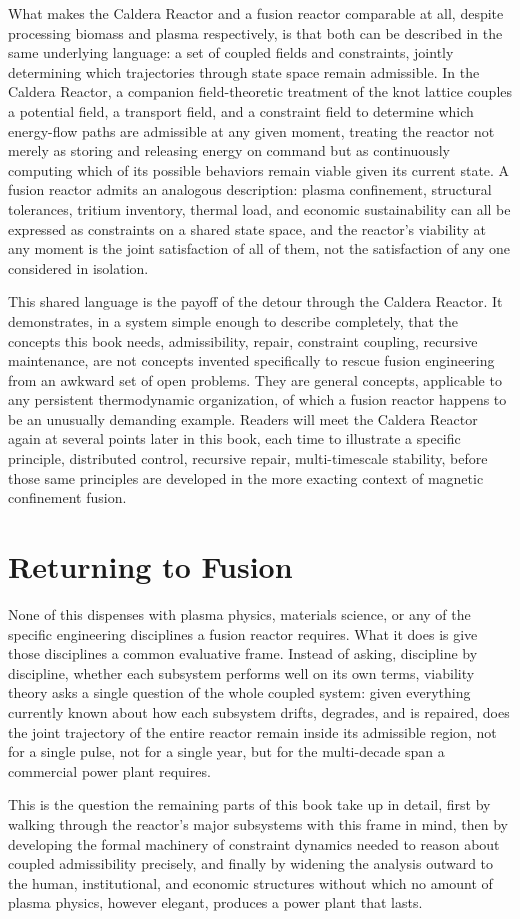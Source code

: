 What makes the Caldera Reactor and a fusion reactor comparable at all, despite processing biomass and plasma respectively, is that both can be described in the same underlying language: a set of coupled fields and constraints, jointly determining which trajectories through state space remain admissible. In the Caldera Reactor, a companion field-theoretic treatment of the knot lattice couples a potential field, a transport field, and a constraint field to determine which energy-flow paths are admissible at any given moment, treating the reactor not merely as storing and releasing energy on command but as continuously computing which of its possible behaviors remain viable given its current state. A fusion reactor admits an analogous description: plasma confinement, structural tolerances, tritium inventory, thermal load, and economic sustainability can all be expressed as constraints on a shared state space, and the reactor's viability at any moment is the joint satisfaction of all of them, not the satisfaction of any one considered in isolation.

This shared language is the payoff of the detour through the Caldera Reactor. It demonstrates, in a system simple enough to describe completely, that the concepts this book needs, admissibility, repair, constraint coupling, recursive maintenance, are not concepts invented specifically to rescue fusion engineering from an awkward set of open problems. They are general concepts, applicable to any persistent thermodynamic organization, of which a fusion reactor happens to be an unusually demanding example. Readers will meet the Caldera Reactor again at several points later in this book, each time to illustrate a specific principle, distributed control, recursive repair, multi-timescale stability, before those same principles are developed in the more exacting context of magnetic confinement fusion.

\section{Returning to Fusion}

None of this dispenses with plasma physics, materials science, or any of the specific engineering disciplines a fusion reactor requires. What it does is give those disciplines a common evaluative frame. Instead of asking, discipline by discipline, whether each subsystem performs well on its own terms, viability theory asks a single question of the whole coupled system: given everything currently known about how each subsystem drifts, degrades, and is repaired, does the joint trajectory of the entire reactor remain inside its admissible region, not for a single pulse, not for a single year, but for the multi-decade span a commercial power plant requires.

This is the question the remaining parts of this book take up in detail, first by walking through the reactor's major subsystems with this frame in mind, then by developing the formal machinery of constraint dynamics needed to reason about coupled admissibility precisely, and finally by widening the analysis outward to the human, institutional, and economic structures without which no amount of plasma physics, however elegant, produces a power plant that lasts.
